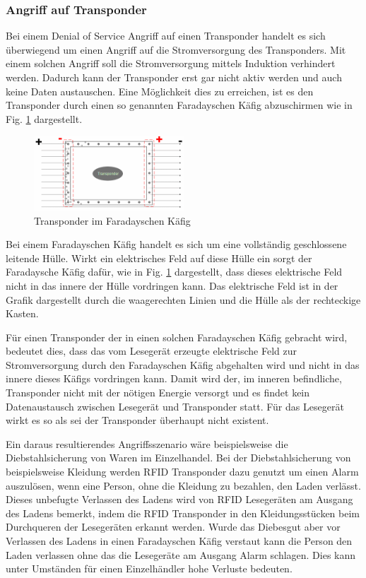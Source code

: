 \documentclass[conference]{IEEEtran}
\begin{document}
\subsubsection{Angriff auf Transponder}
Bei einem Denial of Service Angriff auf einen Transponder handelt es sich überwiegend um einen Angriff auf die Stromversorgung des Transponders. Mit einem solchen Angriff soll die Stromversorgung mittels Induktion verhindert werden. Dadurch kann der Transponder erst gar nicht aktiv werden und auch keine Daten austauschen. Eine Möglichkeit dies zu erreichen, ist es den Transponder durch einen so genannten Faradayschen Käfig abzuschirmen wie in Fig. \ref{fig2} dargestellt.

\begin{figure}[htbp]
\centerline{\includegraphics[width=0.5\textwidth]{img/kaefig.png}}
\caption{Transponder im Faradayschen Käfig \cite{b7}}
\label{fig2}
\end{figure}

Bei einem Faradayschen Käfig handelt es sich um eine vollständig geschlossene leitende Hülle. Wirkt ein elektrisches Feld auf diese Hülle ein sorgt der Faradaysche Käfig dafür, wie in Fig. \ref{fig2} dargestellt, dass dieses elektrische Feld nicht in das innere der Hülle vordringen kann. Das elektrische Feld ist in der Grafik dargestellt durch die waagerechten Linien und die Hülle als der rechteckige Kasten.

Für einen Transponder der in einen solchen Faradayschen Käfig gebracht wird, bedeutet dies, dass das vom Lesegerät erzeugte elektrische Feld zur Stromversorgung durch den Faradayschen Käfig abgehalten wird und nicht in das innere dieses Käfigs vordringen kann. Damit wird der, im inneren befindliche, Transponder nicht mit der nötigen Energie versorgt und es findet kein Datenaustausch zwischen Lesegerät und Transponder statt. Für das Lesegerät wirkt es so als sei der Transponder überhaupt nicht existent.

Ein daraus resultierendes Angriffsszenario wäre beispielsweise die Diebstahlsicherung von Waren im Einzelhandel. Bei der Diebstahlsicherung von beispielsweise Kleidung werden RFID Transponder dazu genutzt um einen Alarm auszulösen, wenn eine Person, ohne die Kleidung zu bezahlen, den Laden verlässt. Dieses unbefugte Verlassen des Ladens wird von RFID Lesegeräten am Ausgang des Ladens bemerkt, indem die RFID Transponder in den Kleidungsstücken beim Durchqueren der Lesegeräten erkannt werden. Wurde das Diebesgut aber vor Verlassen des Ladens in einen Faradayschen Käfig verstaut kann die Person den Laden verlassen ohne das die Lesegeräte am Ausgang Alarm schlagen. Dies kann unter Umständen für einen Einzelhändler hohe Verluste bedeuten.
\end{document}
